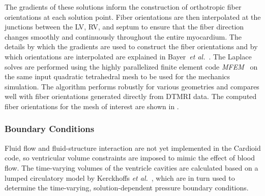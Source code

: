 The gradients of these solutions inform the construction of orthotropic fiber orientations at each solution point. Fiber orientations are then interpolated at the junctions between the LV, RV, and septum to ensure that the fiber direction changes smoothly and continuously throughout the entire myocardium. The details by which the gradients are used to construct the fiber orientations and by which orientations are interpolated are explained in Bayer~\textit{et al.}~\cite{bayer_2012}. The Laplace solves are performed using the highly parallelized finite element code \textit{MFEM}~\cite{mfem-library} on the same input quadratic tetrahedral mesh to be used for the mechanics simulation. The algorithm performs robustly for various geometries and compares well with fiber orientations generated directly from DTMRI data. The computed fiber orientations for the mesh of interest are shown in .

\subsubsection{Boundary Conditions}
\label{Boundary Conditions}

Fluid flow and fluid-structure interaction are not yet implemented in the Cardioid code, so ventricular volume constraints are imposed to mimic the effect of blood flow. The time-varying volumes of the ventricle cavities are calculated based on a lumped circulatory model by Kerckhoffs \textit{et al.}~\cite{kerckhoffs_2006}, which are in turn used to determine the time-varying, solution-dependent pressure boundary conditions.

